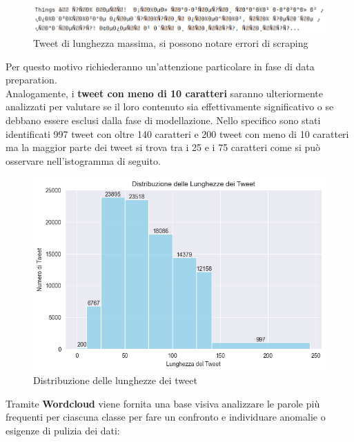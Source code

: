 \documentclass[12pt,a4paper]{report} %
\begin{document}
\begin{figure}[H]
    \centering
    \includegraphics[width=0.75\linewidth]{immagini/tweet_lunghezza_max.png}
    \caption{Tweet di lunghezza massima, si possono notare errori di scraping }
    \label{fig:enter-label}
\end{figure}
Per questo motivo richiederanno un’attenzione particolare in fase di data preparation. \\Analogamente, i\textbf{ tweet con meno di 10 caratteri} saranno ulteriormente analizzati per valutare se il loro contenuto sia effettivamente significativo o se debbano essere esclusi dalla fase di modellazione. Nello specifico sono stati identificati 997 tweet con oltre 140 caratteri e 200 tweet con meno di 10 caratteri ma la maggior parte dei tweet si trova tra i 25 e i 75 caratteri come si può osservare nell'istogramma di seguito.
\begin{figure}[H]
     \centering
     \includegraphics[width=0.75\linewidth]{immagini/lunghezza_tweet.png}
     \caption{Distribuzione delle lunghezze dei tweet}
     \label{fig:enter-label}
 \end{figure}
Tramite \textbf{Wordcloud} viene fornita una base visiva analizzare le parole più frequenti per ciascuna classe per fare un confronto e individuare anomalie o esigenze di pulizia dei dati:
\end{document}
